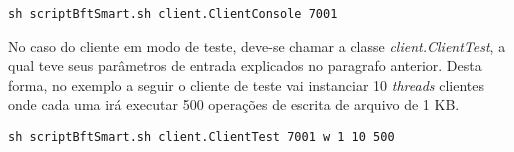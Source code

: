 \begin{lstlisting}
sh scriptBftSmart.sh client.ClientConsole 7001
\end{lstlisting}

No caso do cliente em modo de teste, deve-se chamar a classe \textit{client.ClientTest}, a qual teve seus parâmetros de entrada explicados no paragrafo anterior. Desta forma, no exemplo a seguir o cliente de teste vai instanciar 10 \textit{threads} clientes onde cada uma irá executar 500 operações de escrita de arquivo de 1 KB.
\\

\begin{lstlisting}
sh scriptBftSmart.sh client.ClientTest 7001 w 1 10 500
\end{lstlisting}

